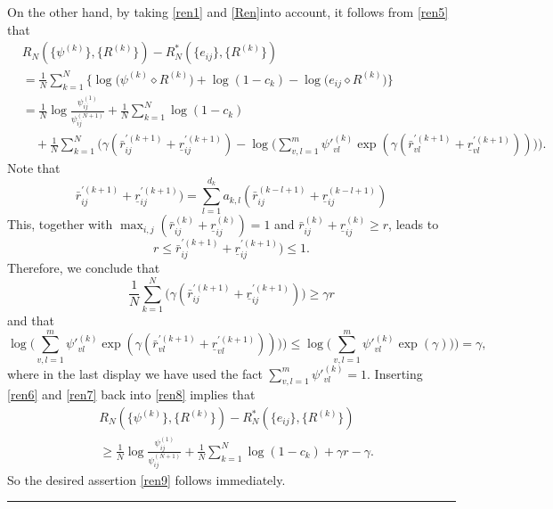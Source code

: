 \documentclass[11pt]{article}
\newcommand{\fin}{\hspace*{\fill}\rule{0.3em}{1ex}}
\newenvironment{proof}{{\bf \noindent Proof.}}{\fin}
\numberwithin{equation}{section}
\begin{document}
\begin{proof}
\begin{equation}
\end{equation}
On the other hand, 
by taking  \eqref{ren1}  and \eqref{Ren}into account, it follows from \eqref{ren5} that 
\begin{equation}\label{ren8}
\begin{split}
&R_N(\{\psi^{(k)}\},\{R^{(k)}\})-R_N^*(\{e_{ij}\},\{R^{(k)}\})\\
&=\frac{1}{N}\sum_{k=1}^{N}\Big\{\log \bigg( \psi^{(k)}\diamond R^{(k)}\bigg)+\log (1-c_k)-\log \bigg(e_{ij}\diamond R^{(k)}\bigg)\Big\}\\
&=\frac{1}{N}\log\frac{\psi^{(1)}_{ij}}{\psi^{(N+1)}_{ij}}+\frac{1}{N}\sum_{k=1}^{N}\log (1-c_k)\\
&\quad+\frac{1}{N}\sum_{k=1}^{N}\bigg(\gamma(\bar r_{ij}^{'(k+1)}+\underline r_{ij}^{'(k+1)})-\log\bigg(\sum_{v,l=1}^{m}\psi'^{(k)}_{vl}\exp(\gamma (\bar r_{vl}^{'(k+1)}+\underline r_{vl}^{'(k+1)}))\bigg)\bigg).
\end{split}
\end{equation}
Note that 
\begin{equation*}
\bar r_{ij}^{'(k+1)}+\underline r_{ij}^{'(k+1)})=\sum_{l=1}^{d_k}a_{k,l}(\bar r_{ij}^{(k-l+1)}+\underline r_{ij}^{(k-l+1)})
\end{equation*}
This, together with $\max_{i,j}(\bar r_{ij}^{(k)}+\underline r_{ij}^{(k)})=1$ and $\bar r_{ij}^{(k)}+\underline r_{ij}^{(k)}\ge r$, leads to 
\begin{equation}\label{Budapest}
r\le \bar r_{ij}^{'(k+1)}+\underline r_{ij}^{'(k+1)})\le 1.
\end{equation}
Therefore, we conclude that 
\begin{equation}\label{ren6}
\frac{1}{N}\sum_{k=1}^{N}\bigg(\gamma(\bar r_{ij}^{'(k+1)}+\underline r_{ij}^{'(k+1)})\bigg)\ge\gamma r
\end{equation}
and that 
\begin{equation}\label{ren7}
\log\bigg(\sum_{v,l=1}^{m}\psi'^{(k)}_{vl}\exp(\gamma (\bar r_{vl}^{'(k+1)}+\underline r_{vl}^{'(k+1)}))\bigg)\bigg)\le\log\bigg(\sum_{v,l=1}^{m}\psi'^{(k)}_{vl}\exp(\gamma )\bigg)\bigg)=\gamma,
\end{equation}
where in the last display we have used the fact $\sum_{v,l=1}^{m}\psi'^{(k)}_{vl}=1$. Inserting \eqref{ren6} and \eqref{ren7} back into \eqref{ren8} implies that 
\begin{equation} 
\begin{split}
&R_N(\{\psi^{(k)}\},\{R^{(k)}\})-R_N^*(\{e_{ij}\},\{R^{(k)}\})\\
&\ge\frac{1}{N}\log\frac{\psi^{(1)}_{ij}}{\psi^{(N+1)}_{ij}}+\frac{1}{N}\sum_{k=1}^{N}\log (1-c_k)+\gamma r-\gamma
.
\end{split}
\end{equation}
So the desired assertion \eqref{ren9} follows immediately. 



\end{proof}
\end{document}

